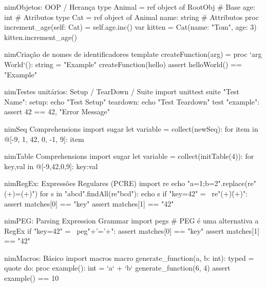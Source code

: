 \documentclass[10pt, a4paper]{article}
\begin{document}
\begin{multicols}{4}
\begin{codebox}{nim}{Objetos: OOP / Herança}
type Animal = ref object of RootObj # Base
  age: int # Atributos
type Cat = ref object of Animal
  name: string  # Attributos
proc increment_age(self: Cat) =
  self.age.inc()
var kitten = Cat(name: "Tom", age: 3)
kitten.increment_age()
\end{codebox}


\begin{codebox}{nim}{Criação de nomes de identificadores}
template createFunction(arg) =
  proc `arg  World`(): string = "Example"
createFunction(hello)
assert helloWorld() == "Example"
\end{codebox}


\begin{codebox}{nim}{Testes unitários: Setup / TearDown / Suite}
import unittest
suite "Test Name":
  setup:
    echo "Test Setup"
  teardown:
    echo "Test Teardown"
  test "example":
    assert 42 == 42, "Error Message"
\end{codebox}


\begin{codebox}{nim}{Seq Comprehensions}
import sugar
let variable = collect(newSeq):
  for item in @[-9, 1, 42, 0, -1, 9]: item
\end{codebox}


\begin{codebox}{nim}{Table Comprehensions}
import sugar
let variable = collect(initTable(4)):
  for key,val in @[-9,42,0,9]: {key:val}
\end{codebox}


\begin{codebox}{nim}{RegEx: Expressões Regulares (PCRE)}
import re
echo "a=1;b=2".replace(re"(\w+)=(\w+)")
for s in "abcd".findAll(re"bcd"): echo s
if "key=42" =~ re"(\w+)\=(\w+)":
  assert matches[0] == "key"
  assert matches[1] == "42"
\end{codebox}


\begin{codebox}{nim}{PEG: Parsing Expression Grammar}
import pegs # PEG é uma alternativa a RegEx
if "key=42" =~ peg"{\w+}'='{\w+}":
  assert matches[0] == "key"
  assert matches[1] == "42"
\end{codebox}


\begin{codebox}{nim}{Macros: Básico}
import macros
macro generate_function(a, b: int): typed =
  quote do:
    proc example(): int = `a` + `b`
generate_function(6, 4)
assert example() == 10
\end{codebox}



\end{multicols}
\end{document}
